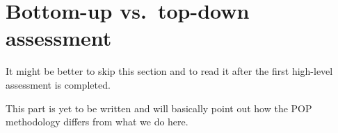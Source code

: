 \section{Bottom-up vs.~top-down assessment}
\label{section:related-work:bottom-up}


\begin{readerguide}
 It might be better to skip this section and to read it after the first
 high-level assessment is completed.
\end{readerguide}

\begin{wip}
 This part is yet to be written and will basically point out how the POP methodology differs from what we do here.
\end{wip}


